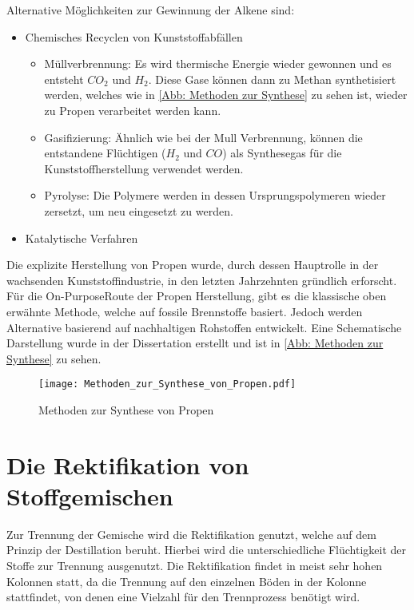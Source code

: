 \documentclass[12pt,a4paper,bibtotocnumbered,liststotocnumbered]{scrreprt}
\begin{document}
Alternative Möglichkeiten zur Gewinnung der Alkene sind:
\begin{itemize}
\item Chemisches Recyclen von Kunststoffabfällen
\begin{itemize}
\item Müllverbrennung: Es wird thermische Energie wieder gewonnen und es entsteht $CO_2$ und $H_2$. Diese Gase können dann zu Methan synthetisiert werden, welches wie in \autoref{Abb: Methoden zur Synthese} zu sehen ist, wieder zu Propen verarbeitet werden kann.
\item Gasifizierung: Ähnlich wie bei der Mull Verbrennung, können die entstandene Flüchtigen ($H_2$ und $CO$) als Synthesegas für die Kunststoffherstellung verwendet werden. 
\item Pyrolyse: Die Polymere werden in dessen Ursprungspolymeren wieder zersetzt, um neu eingesetzt zu werden.
\end{itemize}
\item Katalytische Verfahren \cite{Schneider}
\end{itemize}

Die explizite Herstellung von Propen wurde, durch dessen Hauptrolle in der wachsenden Kunststoffindustrie, in den letzten Jahrzehnten gründlich erforscht. Für die \glqq On-Purpose\grqq Route der Propen Herstellung, gibt es die klassische oben erwähnte Methode, welche auf fossile Brennstoffe basiert. Jedoch werden Alternative basierend auf nachhaltigen Rohstoffen entwickelt. Eine Schematische Darstellung wurde in der Dissertation \cite{Weinkraut} erstellt und ist in \autoref{Abb: Methoden zur Synthese} zu sehen. 

\begin{figure}[H]
\begin{center}
\texttt{[image: Methoden\_zur\_Synthese\_von\_Propen.pdf]}
\caption{Methoden zur Synthese von Propen \cite{Weinkraut}}
\label{Abb: Methoden zur Synthese}
\end{center}
\end{figure}

\chapter{Die Rektifikation von Stoffgemischen}
Zur Trennung der Gemische wird die Rektifikation genutzt, welche auf dem Prinzip der Destillation beruht. Hierbei wird die unterschiedliche Flüchtigkeit der Stoffe zur Trennung ausgenutzt. Die Rektifikation findet in meist sehr hohen Kolonnen statt, da die Trennung auf den einzelnen Böden in der Kolonne stattfindet, von denen eine Vielzahl für den Trennprozess benötigt wird.
\end{document}
